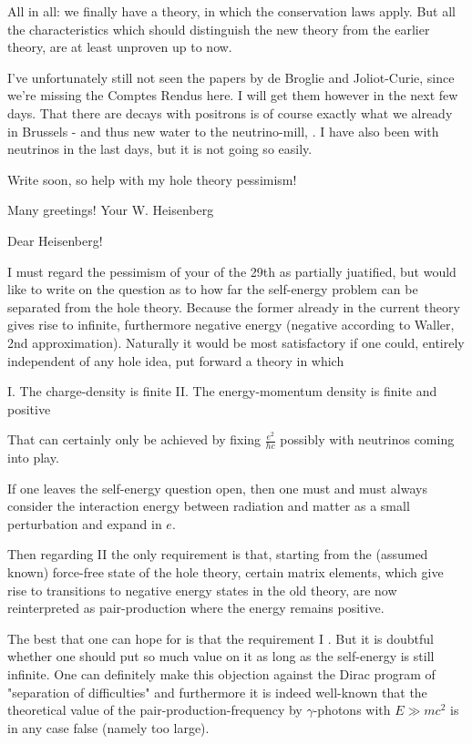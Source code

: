 \documentclass{article}
\begin{document}
All in all: we finally have a theory, in which the conservation laws apply. But all the characteristics which should distinguish the new theory from the earlier theory, are at least unproven up to now.

I've unfortunately still not seen the papers by de Broglie and Joliot-Curie, since we're missing the Comptes Rendus here. I will get them however in the next few days. That there are decays with positrons is of course exactly what we already  in Brussels - and thus new water to the neutrino-mill, . I have also been  with neutrinos in the last days, but it is not going so easily.

Write soon, so help with my hole theory pessimism!

Many greetings!
Your W. Heisenberg

\date{January 30, 1934}

Dear Heisenberg!

I must regard the pessimism of your  of the 29th as partially juatified, but would like to write on the question as to how far the self-energy problem can be separated from the hole theory. Because the former already in the current theory gives rise to infinite, furthermore negative energy (negative according to Waller, 2nd approximation). Naturally it would be most satisfactory if one could, entirely independent of any hole idea, put forward a theory in which

I. The charge-density is finite
II. The energy-momentum density is finite and positive

That can certainly only be achieved by fixing $\frac{e^2}{hc}$ possibly with neutrinos coming into play.

If one leaves the self-energy question open, then one must  and must always consider the interaction energy between radiation and matter as a small perturbation and expand in $e$.

Then regarding II the only requirement is that, starting from the (assumed known) force-free state of the hole theory, certain matrix elements, which give rise to transitions to negative energy states in the old theory, are now reinterpreted as pair-production where the energy remains positive.

The best that one can hope for is that the requirement I . But it is doubtful whether one should put so much value on it as long as the self-energy is still infinite.
One can definitely make this objection against the Dirac program of "separation of difficulties" and furthermore it is indeed well-known that the theoretical value of the pair-production-frequency by $\gamma$-photons with $E \gg mc^2$ is in any case false (namely too large).
\end{document}

